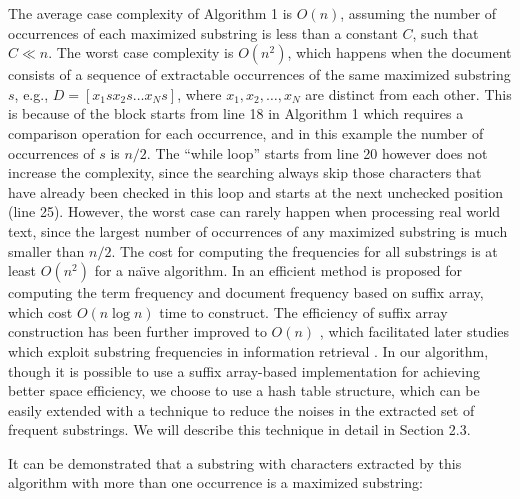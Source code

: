 \documentclass[english]{jnlp_1.4}
\begin{document}
The average case complexity of Algorithm 1 is $O(n)$, assuming the number of occurrences of each maximized substring is less than a constant $C$, such that $C \ll n$. The worst case complexity is $O(n^2)$, which happens when the document consists of a sequence of extractable occurrences of the same maximized substring $s$, e.g., $D=[x_1 s x_2 s \ldots x_N s]$, where $x_1,x_2, \ldots ,x_N$ are distinct from each other. This is because of the block starts from line 18 in Algorithm 1 which requires a comparison operation for each occurrence, and in this example the number of occurrences of $s$ is $n/2$. The ``while loop'' starts from line 20 however does not increase the complexity, since the searching always skip those characters that have already been checked in this loop and starts at the next unchecked position (line 25). However, the worst case can rarely happen when processing real world text, since the largest number of occurrences of any maximized substring is much smaller than $n/2$. The cost for computing the frequencies for all substrings is at least $O(n^2)$ for a na\"{\i}ve algorithm. In  an efficient method is proposed for computing the term frequency and document frequency based on suffix array, which cost $O(n\log n)$ time to construct. The efficiency of suffix array construction has been further improved to $O(n)$ \cite{karkkainen2003simple,karkkainen2006linear,ko2003space,kim2003linear,nong2011two}, which facilitated later studies which exploit substring frequencies in information retrieval \cite{ngefficient,grossi2005compressed}. In our algorithm, though it is possible to use a suffix array-based implementation for achieving better space efficiency, we choose to use a hash table structure, which can be easily extended with a technique to reduce the noises in the extracted set of frequent substrings. We will describe this technique in detail in Section 2.3. 

It can be demonstrated that a substring  with  characters extracted by this algorithm with more than one occurrence is a maximized substring:
\end{document}
